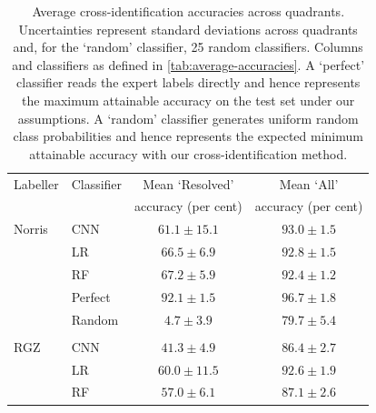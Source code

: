 \documentclass[fleqn,usenatbib,usedcolumn]{mnras}
\begin{document}
\begin{table}
  \caption{Average cross-identification accuracies across quadrants.
    Uncertainties represent standard deviations across quadrants and, for
    the `random' classifier, 25 random classifiers. Columns and
    classifiers as defined in \autoref{tab:average-accuracies}.  A
    `perfect' classifier reads the expert labels directly and hence
    represents the maximum attainable accuracy on the test set under our
    assumptions. A `random' classifier generates uniform random class
    probabilities and hence represents the expected minimum attainable
    accuracy with our cross-identification method.}
    \label{tab:cross-id-accuracies}
  \begin{tabular}{llcc}
  \hline
  Labeller & Classifier  & Mean `Resolved' & Mean `All' \\
   & & accuracy (per cent) & accuracy (per cent)\\
  \hline
  Norris & CNN & $61.1 \pm 15.1$ & $93.0 \pm 1.5$\\
   & LR & $66.5 \pm 6.9$ & $92.8 \pm 1.5$\\
   & RF & $67.2 \pm 5.9$ & $92.4 \pm 1.2$\\
   & Perfect & $92.1 \pm 1.5$ & $96.7 \pm 1.8$\\
   & Random & $4.7 \pm 3.9$ & $79.7 \pm 5.4$\\
   \\
  RGZ & CNN & $41.3 \pm 4.9$ & $86.4 \pm 2.7$\\
   & LR & $60.0 \pm 11.5$ & $92.6 \pm 1.9$\\
   & RF & $57.0 \pm 6.1$ & $87.1 \pm 2.6$\\
   \hline
  \end{tabular}
\end{table}
\end{document}
